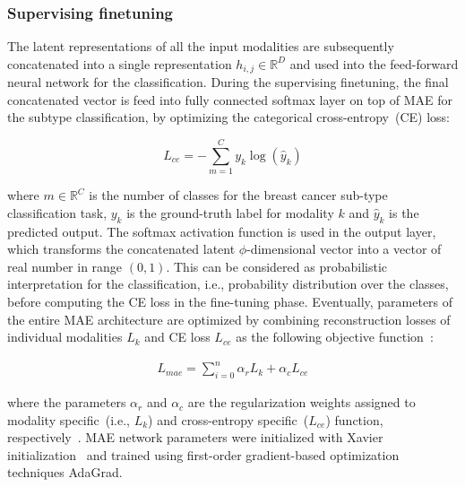 \subsubsection{Supervising finetuning} 
The latent representations of all the input modalities are subsequently concatenated into a single representation $h_{i,j} \in \mathbb{R}^{D}$ and used into the feed-forward neural network for the classification. During the supervising finetuning, the final concatenated vector is feed into fully connected softmax layer on top of MAE for the subtype classification, by optimizing the categorical cross-entropy~(CE) loss: 

\begin{equation} 
    L_{ce}=-\sum_{m=1}^{C} y_{k} \log \left(\hat{y}_{k}\right)
\end{equation} 

\hspace*{3.5mm} where $m \in \mathbb{R}^{C}$ is the number of classes for the breast cancer sub-type classification task, $y_{k}$ is the ground-truth label for modality $k$ and $\hat{y}_{k}$ is the predicted output. The softmax activation function is used in the output layer, which transforms the concatenated latent $\phi$-dimensional vector into a vector of real number in range $\left(0,1\right)$. This can be considered as probabilistic interpretation for the classification, i.e., probability distribution over the classes, before computing the CE loss in the fine-tuning phase. Eventually, parameters of the entire MAE architecture are optimized by combining reconstruction losses of individual modalities ${L}_{k}$ and CE loss ${L}_{ce}$ as the following objective function~\cite{mmdcae}: 

\begin{align}
    L_{mae}=\sum_{i=0}^{n} \alpha_{r} {L}_{k}+\alpha_{c} {L}_{ce}
    \label{eq:sum}
\end{align}

\hspace*{3.5mm} where the parameters $\alpha_{r}$ and $\alpha_{c}$ are the regularization weights assigned to modality specific~(i.e., ${L}_{k}$) and cross-entropy specific~(${L}_{ce}$) function, respectively~\cite{mmdcae}. MAE network parameters were initialized with Xavier initialization~\cite{xavier} and trained using first-order gradient-based optimization techniques AdaGrad. 

